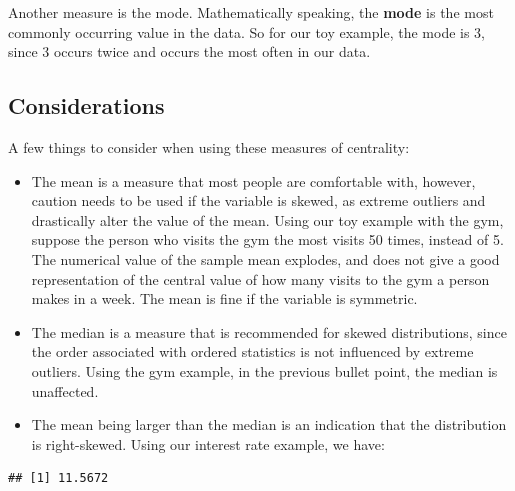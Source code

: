 \documentclass[
]{book}
\newenvironment{Shaded}{\begin{snugshade}}{\end{snugshade}}
\newcommand{\FunctionTok}[1]{\textcolor[rgb]{0.13,0.29,0.53}{\textbf{#1}}}
\newcommand{\NormalTok}[1]{#1}
\newcommand{\SpecialCharTok}[1]{\textcolor[rgb]{0.81,0.36,0.00}{\textbf{#1}}}
\begin{document}
Another measure is the mode. Mathematically speaking, the \textbf{mode} is the most commonly occurring value in the data. So for our toy example, the mode is 3, since 3 occurs twice and occurs the most often in our data.

\hypertarget{considerations}{%
\subsection{Considerations}\label{considerations}}

A few things to consider when using these measures of centrality:

\begin{itemize}
\item
  The mean is a measure that most people are comfortable with, however, caution needs to be used if the variable is skewed, as extreme outliers and drastically alter the value of the mean. Using our toy example with the gym, suppose the person who visits the gym the most visits 50 times, instead of 5. The numerical value of the sample mean explodes, and does not give a good representation of the central value of how many visits to the gym a person makes in a week. The mean is fine if the variable is symmetric.
\item
  The median is a measure that is recommended for skewed distributions, since the order associated with ordered statistics is not influenced by extreme outliers. Using the gym example, in the previous bullet point, the median is unaffected.
\item
  The mean being larger than the median is an indication that the distribution is right-skewed. Using our interest rate example, we have:
\end{itemize}

\begin{Shaded}
\end{Shaded}

\begin{verbatim}
## [1] 11.5672
\end{verbatim}

\begin{Shaded}
\end{Shaded}
\end{document}
